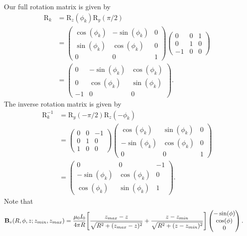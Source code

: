 \documentclass{article}
\let\vec\mathbf
\begin{document}
Our full rotation matrix is given by
\[\begin{aligned}
    \text{R}_k&=\text{R}_z(\phi_k)\text{R}_y(\pi/2) \\
    &=\begin{pmatrix}
        \cos(\phi_k) & -\sin(\phi_k) & 0 \\
        \sin(\phi_k) & \cos(\phi_k) & 0 \\
        0 & 0 & 1
    \end{pmatrix}
    \begin{pmatrix}
        0 & 0 & 1 \\
        0 & 1 & 0 \\
        -1 & 0 & 0
    \end{pmatrix} \\
    &= \begin{pmatrix}
        0 & -\sin(\phi_k) & \cos(\phi_k) \\
        0 & \cos(\phi_k) & \sin(\phi_k) \\
        -1 & 0 & 0
    \end{pmatrix}.
\end{aligned} \]
The inverse rotation matrix is given by
\[\begin{aligned}
    \text{R}^{-1}_k &= \text{R}_y(-\pi/2)\text{R}_z(-\phi_k) \\
    &= \begin{pmatrix}
        0 & 0 & -1 \\
        0 & 1 & 0 \\
        1 & 0 & 0
    \end{pmatrix}
    \begin{pmatrix}
        \cos(\phi_k) & \sin(\phi_k) & 0 \\
        -\sin(\phi_k) & \cos(\phi_k) & 0 \\
        0 & 0 & 1
    \end{pmatrix} \\
    &= \begin{pmatrix}
        0 & 0 & -1 \\
        -\sin(\phi_k) & \cos(\phi_k) & 0 \\
        \cos(\phi_k) & \sin(\phi_k) & 1
    \end{pmatrix}.
\end{aligned}\]
Note that
\[\begin{aligned}
    \vec{B}_{v}(R, \phi, z; z_{min}, z_{max}) &= \frac{\mu_0 I_0}{4\pi R}\qty[\frac{z_{max}-z}{\sqrt{R^2+(z_{max}-z)^2}} + \frac{z-z_{min}}{\sqrt{R^2+(z-z_{min})^2}}]
    \begin{pmatrix}
        -\sin(\phi) \\
        \cos(\phi) \\
        0
    \end{pmatrix}.
\end{aligned}\]
\end{document}
